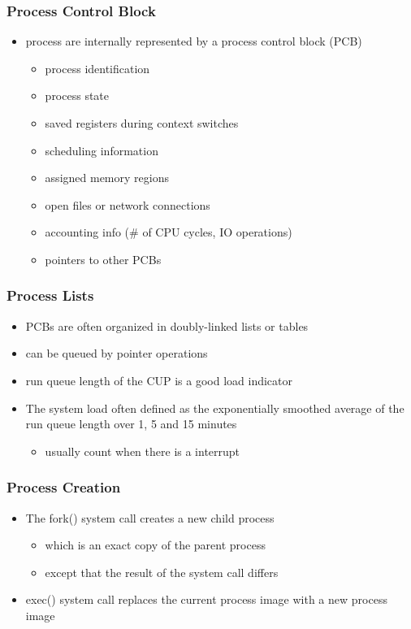 \documentclass[11pt]{article}
\begin{document}
\subsubsection{Process Control Block}
\label{sec:orgec41595}
\begin{itemize}
\item process are internally represented by a process control block (PCB)
\begin{itemize}
\item process identification
\item process state
\item saved registers during context switches
\item scheduling information
\item assigned memory regions
\item open files or network connections
\item accounting info (\# of CPU cycles, IO operations)
\item pointers to other PCBs
\end{itemize}
\end{itemize}
\subsubsection{Process Lists}
\label{sec:org71388a5}
\begin{itemize}
\item PCBs are often organized in doubly-linked lists or tables
\item can be queued by pointer operations
\item run queue length of the CUP is a good load indicator
\item The system load often defined as the exponentially smoothed average of the run queue length over 1, 5 and 15 minutes
\begin{itemize}
\item usually count when there is a interrupt
\end{itemize}
\end{itemize}
\subsubsection{Process Creation}
\label{sec:org8ee2216}
\begin{itemize}
\item The fork() system call creates a new child process
\begin{itemize}
\item which is an exact copy of the parent process
\item except that the result of the system call differs
\end{itemize}
\item exec() system call replaces the current process image with a new process image
\end{itemize}
\end{document}
